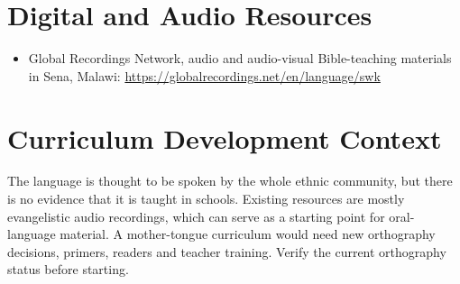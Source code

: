 \documentclass[12pt]{article}
\begin{document}
\section{Digital and Audio Resources}
\begin{itemize}
\item Global Recordings Network, audio and audio-visual Bible-teaching materials in Sena, Malawi: \url{https://globalrecordings.net/en/language/swk}
\end{itemize}

\section{Curriculum Development Context}
The language is thought to be spoken by the whole ethnic community, but there is no evidence that it is taught in schools. Existing resources are mostly evangelistic audio recordings, which can serve as a starting point for oral-language material. A mother-tongue curriculum would need new orthography decisions, primers, readers and teacher training. Verify the current orthography status before starting.
\end{document}
